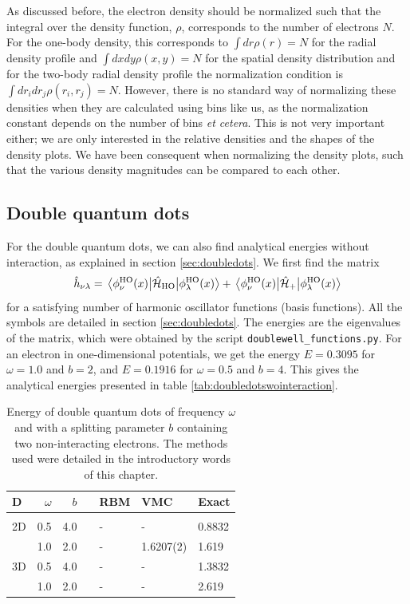 As discussed before, the electron density should be normalized such that the integral over the density function, $\rho$, corresponds to the number of electrons $N$. For the one-body density, this corresponds to $\int dr\rho(r)=N$ for the radial density profile and $\int dxdy\rho(x,y)=N$ for the spatial density distribution and for the two-body radial density profile the normalization condition is $\int dr_idr_j\rho(r_i,r_j)=N$. However, there is no standard way of normalizing these densities when they are calculated using bins like us, as the normalization constant depends on the number of bins \textit{et cetera}. This is not very important either; we are only interested in the relative densities and the shapes of the density plots. We have been consequent when normalizing the density plots, such that the various density magnitudes can be compared to each other.

\iffalse
\newpage
\subsection{Double quantum dots}
For the double quantum dots, we can also find analytical energies without interaction, as explained in section \ref{sec:doubledots}. We first find the matrix 
\begin{equation*}
\hat{h}_{\nu\lambda}=\mel{\phi_{\nu}^{\text{HO}}(x)}{\hat{\mathcal{H}}_{\text{HO}}}{\phi_{\lambda}^{\text{HO}}(x)}+\mel{\phi_{\nu}^{\text{HO}}(x)}{\hat{\mathcal{H}}_{\text{+}}}{\phi_{\lambda}^{\text{HO}}(x)}
\end{equation*}
for a satisfying number of harmonic oscillator functions (basis functions). All the symbols are detailed in section \ref{sec:doubledots}. The energies are the eigenvalues of the matrix, which were obtained by the script \texttt{doublewell\_functions.py}. For an electron in one-dimensional potentials, we get the energy $E=0.3095$ for $\omega=1.0$ and $b=2$, and $E=0.1916$ for $\omega=0.5$ and $b=4$. This gives the analytical energies presented in table \eqref{tab:doubledotswointeraction}. 
\begin{table} [H]
	\caption{Energy of double quantum dots of frequency $\omega$ and with a splitting parameter $b$ containing two non-interacting electrons. The methods used were detailed in the introductory words of this chapter.}
	\label{tab:doubledotswointeraction}
	\begin{tabularx}{\textwidth}{lrrrR{3.5cm}R{3.5cm}R{3.5cm}} \hline\hline
		D & $\omega$ & $b$ & \makecell{\\ \phantom{=}} & RBM & VMC & Exact \\ \hline \\
		
		2D & 0.5 & 4.0 && - & - & 0.8832 \\
		& 1.0 & 2.0 && - & 1.6207(2) & 1.619 \\
		3D & 0.5 & 4.0 && - & - & 1.3832 \\
		& 1.0 & 2.0 && - & - & 2.619 \\ \hline\hline
	\end{tabularx}
\end{table}

